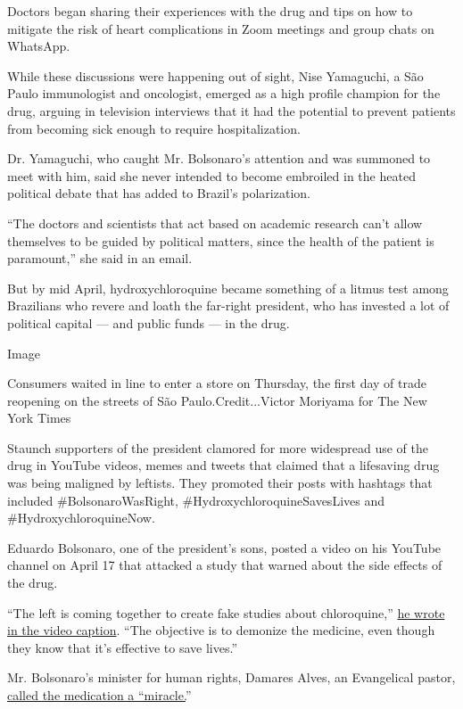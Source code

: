 Doctors began sharing their experiences with the drug and tips on how to
mitigate the risk of heart complications in Zoom meetings and group
chats on WhatsApp.

While these discussions were happening out of sight, Nise Yamaguchi, a
São Paulo immunologist and oncologist, emerged as a high profile
champion for the drug, arguing in television interviews that it had the
potential to prevent patients from becoming sick enough to require
hospitalization.

Dr. Yamaguchi, who caught Mr. Bolsonaro's attention and was summoned to
meet with him, said she never intended to become embroiled in the heated
political debate that has added to Brazil's polarization.

``The doctors and scientists that act based on academic research can't
allow themselves to be guided by political matters, since the health of
the patient is paramount,'' she said in an email.

But by mid April, hydroxychloroquine became something of a litmus test
among Brazilians who revere and loath the far-right president, who has
invested a lot of political capital --- and public funds --- in the
drug.

Image

Consumers waited in line to enter a store on Thursday, the first day of
trade reopening on the streets of São Paulo.Credit...Victor Moriyama for
The New York Times

Staunch supporters of the president clamored for more widespread use of
the drug in YouTube videos, memes and tweets that claimed that a
lifesaving drug was being maligned by leftists. They promoted their
posts with hashtags that included \#BolsonaroWasRight,
\#HydroxychloroquineSavesLives and \#HydroxychloroquineNow.

Eduardo Bolsonaro, one of the president's sons, posted a video on his
YouTube channel on April 17 that attacked a study that warned about the
side effects of the drug.

``The left is coming together to create fake studies about
chloroquine,'' \href{https://www.youtube.com/watch?v=q5--FDXaOg4}{he
wrote in the video caption}. ``The objective is to demonize the
medicine, even though they know that it's effective to save lives.''

Mr. Bolsonaro's minister for human rights, Damares Alves, an Evangelical
pastor, \href{https://www.instagram.com/p/CALEk5FAIhx/}{called the
medication a ``miracle.}''

